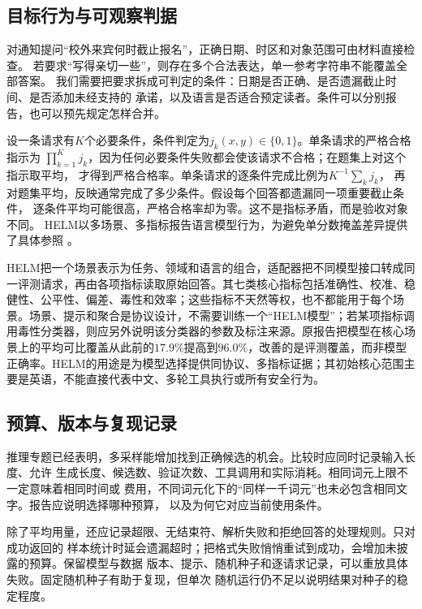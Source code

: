 \subsection{目标行为与可观察判据}
\label{sec:nlp-eval-criteria}

对通知提问“校外来宾何时截止报名”，正确日期、时区和对象范围可由材料直接检查。
若要求“写得亲切一些”，则存在多个合法表达，单一参考字符串不能覆盖全部答案。
我们需要把要求拆成可判定的条件：日期是否正确、是否遗漏截止时间、是否添加未经支持的
承诺，以及语言是否适合预定读者。条件可以分别报告，也可以预先规定怎样合并。

设一条请求有$K$个必要条件，条件判定为$j_k(x,y)\in\{0,1\}$。单条请求的严格合格指示为
$\prod_{k=1}^K j_k$，因为任何必要条件失败都会使该请求不合格；在题集上对这个指示取平均，
才得到严格合格率。单条请求的逐条件完成比例为$K^{-1}\sum_kj_k$，
再对题集平均，反映通常完成了多少条件。假设每个回答都遗漏同一项重要截止条件，
逐条件平均可能很高，严格合格率却为零。这不是指标矛盾，而是验收对象不同。
HELM以多场景、多指标报告语言模型行为，为避免单分数掩盖差异提供了具体参照
。

HELM把一个场景表示为任务、领域和语言的组合，适配器把不同模型接口转成同一评测请求，再由各项指标读取原始回答。其七类核心指标包括准确性、校准、稳健性、公平性、偏差、毒性和效率；这些指标不天然等权，也不都能用于每个场景。场景、提示和聚合是协议设计，不需要训练一个“HELM模型”；若某项指标调用毒性分类器，则应另外说明该分类器的参数及标注来源。原报告把模型在核心场景上的平均可比覆盖从此前的$17.9\%$提高到$96.0\%$，改善的是评测覆盖，而非模型正确率。HELM的用途是为模型选择提供同协议、多指标证据；其初始核心范围主要是英语，不能直接代表中文、多轮工具执行或所有安全行为。

\subsection{预算、版本与复现记录}
\label{sec:nlp-eval-budget}

推理专题已经表明，多采样能增加找到正确候选的机会。比较时应同时记录输入长度、允许
生成长度、候选数、验证次数、工具调用和实际消耗。相同词元上限不一定意味着相同时间或
费用，不同词元化下的“同样一千词元”也未必包含相同文字。报告应说明选择哪种预算，
以及为何它对应当前使用条件。

除了平均用量，还应记录超限、无结束符、解析失败和拒绝回答的处理规则。只对成功返回的
样本统计时延会遗漏超时；把格式失败悄悄重试到成功，会增加未披露的预算。保留模型与数据
版本、提示、随机种子和逐请求记录，可以重放具体失败。固定随机种子有助于复现，但单次
随机运行仍不足以说明结果对种子的稳定程度。

